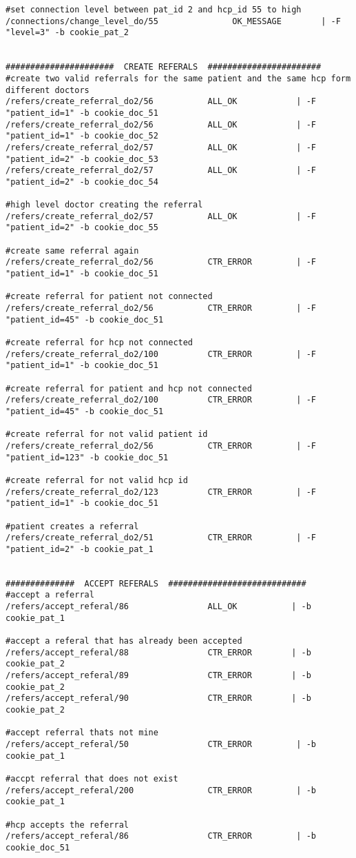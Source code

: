 \begin{verbatim}
#set connection level between pat_id 2 and hcp_id 55 to high
/connections/change_level_do/55               OK_MESSAGE        | -F "level=3" -b cookie_pat_2


######################  CREATE REFERALS  #######################
#create two valid referrals for the same patient and the same hcp form different doctors
/refers/create_referral_do2/56           ALL_OK		       | -F "patient_id=1" -b cookie_doc_51
/refers/create_referral_do2/56           ALL_OK		       | -F "patient_id=1" -b cookie_doc_52
/refers/create_referral_do2/57           ALL_OK			   | -F "patient_id=2" -b cookie_doc_53
/refers/create_referral_do2/57           ALL_OK		       | -F "patient_id=2" -b cookie_doc_54

#high level doctor creating the referral
/refers/create_referral_do2/57           ALL_OK		       | -F "patient_id=2" -b cookie_doc_55

#create same referral again
/refers/create_referral_do2/56           CTR_ERROR         | -F "patient_id=1" -b cookie_doc_51

#create referral for patient not connected
/refers/create_referral_do2/56           CTR_ERROR         | -F "patient_id=45" -b cookie_doc_51

#create referral for hcp not connected
/refers/create_referral_do2/100          CTR_ERROR         | -F "patient_id=1" -b cookie_doc_51

#create referral for patient and hcp not connected
/refers/create_referral_do2/100          CTR_ERROR         | -F "patient_id=45" -b cookie_doc_51

#create referral for not valid patient id
/refers/create_referral_do2/56           CTR_ERROR         | -F "patient_id=123" -b cookie_doc_51

#create referral for not valid hcp id
/refers/create_referral_do2/123          CTR_ERROR         | -F "patient_id=1" -b cookie_doc_51

#patient creates a referral
/refers/create_referral_do2/51           CTR_ERROR         | -F "patient_id=2" -b cookie_pat_1


##############  ACCEPT REFERALS  ############################
#accept a referral
/refers/accept_referal/86                ALL_OK		      | -b cookie_pat_1

#accept a referal that has already been accepted
/refers/accept_referal/88                CTR_ERROR        | -b cookie_pat_2
/refers/accept_referal/89                CTR_ERROR        | -b cookie_pat_2
/refers/accept_referal/90                CTR_ERROR        | -b cookie_pat_2

#accept referral thats not mine
/refers/accept_referal/50                CTR_ERROR         | -b cookie_pat_1

#accpt referral that does not exist
/refers/accept_referal/200               CTR_ERROR         | -b cookie_pat_1

#hcp accepts the referral
/refers/accept_referal/86                CTR_ERROR         | -b cookie_doc_51
\end{verbatim}





